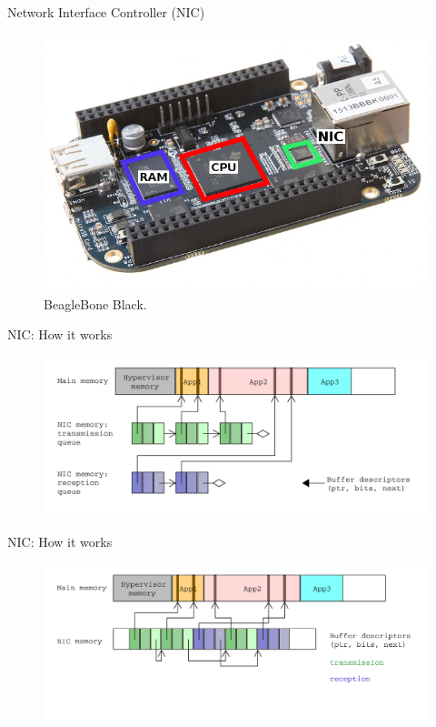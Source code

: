 \documentclass{beamer}
\begin{document}
\begin{frame}{Network Interface Controller (NIC)}
    \begin{figure}
        \includegraphics[]{figures/BBB_cpu_ram_nic.png}
        \caption{BeagleBone Black.}
        \label{bbb_nic}
    \end{figure}
\end{frame}

\begin{frame}{NIC: How it works}
    \begin{figure}
        \includegraphics[width=\textwidth]{figures/nic-bd.pdf}
        \label{nic_bd}
    \end{figure}
\end{frame}

\begin{frame}{NIC: How it works}
    \begin{figure}
        \includegraphics[width=\textwidth]{figures/nic-bd-in_mem.pdf}
        \label{nic_bd_inmem}
    \end{figure}
\end{frame}
\end{document}
